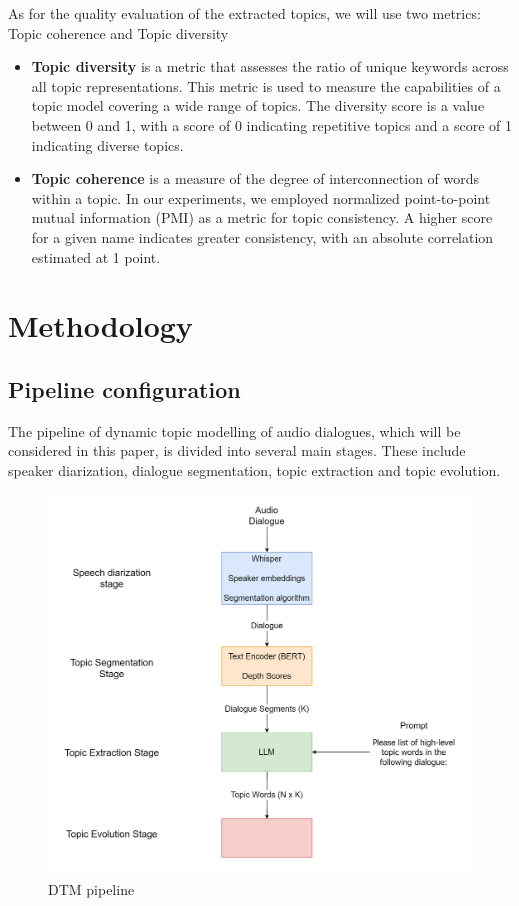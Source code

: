 \documentclass[PMI,VKR]{HSEUniversity}
\begin{document}
As for the quality evaluation of the extracted topics, we will use two metrics: Topic coherence and Topic diversity
\begin{itemize}
    \item \textbf{Topic diversity} \cite{topicdiversity:2019} is a metric that assesses the ratio of unique keywords across all topic representations. This metric is used to measure the capabilities of a topic model covering a wide range of topics. The diversity score is a value between 0 and 1, with a score of 0 indicating repetitive topics and a score of 1 indicating diverse topics.
    \item \textbf{Topic coherence} \cite{topiccoh:2009} is a measure of the degree of interconnection of words within a topic. In our experiments, we employed normalized point-to-point mutual information (PMI) as a metric for topic consistency. A higher score for a given name indicates greater consistency, with an absolute correlation estimated at 1 point.
\end{itemize}


\chapter{Methodology}

\section{Pipeline configuration}

The pipeline of dynamic topic modelling of audio dialogues, which will be considered in this paper, is divided into several main stages. 
These include speaker diarization, dialogue segmentation, topic extraction and topic evolution. 

\begin{figure}[h]
    \centering
    \includegraphics[scale=0.7]{img/pipeline.png}
    \caption{DTM pipeline}
\end{figure}
\end{document}
